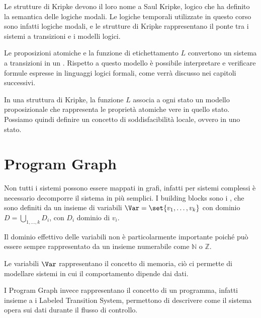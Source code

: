 Le strutture di Kripke devono il loro nome a Saul Kripke, logico che ha definito la semantica delle logiche modali. Le logiche temporali utilizzate in questo corso sono infatti logiche modali, e le strutture di Kripke rappresentano il ponte tra i sistemi a transizioni e i modelli logici.

Le proposizioni atomiche e la funzione di etichettamento \(L\) convertono un sistema a transizioni in un . Rispetto a questo modello è possibile interpretare e verificare formule espresse in linguaggi logici formali, come verrà discusso nei capitoli successivi.

In una struttura di Kripke, la funzione \(L\) associa a ogni stato un modello proposizionale che rappresenta le proprietà atomiche vere in quello stato.
Possiamo quindi definire un concetto di soddisfacibilità locale, ovvero in uno stato.


\section{Program Graph}
Non tutti i sistemi possono essere mappati in grafi, infatti per sistemi complessi è necessario decomporre il sistema in  più semplici.
I building blocks  sono i , che sono definiti da un insieme di variabili \(\Var = \set{v_1,\ldots,v_k}\) con dominio \(D = \bigcup_{1,\ldots,k} D_i\), con \(D_i\) dominio di \(v_i\).

\begin{note}{}
  Il dominio effettivo delle variabili non è particolarmente importante poiché può essere sempre rappresentato da un insieme numerabile come \(\mathbb{N}\) o \(\mathbb{Z}\).
\end{note}

Le variabili \(\Var\) rappresentano il concetto di memoria, ciò ci permette di modellare sistemi in cui il comportamento dipende dai dati.

I Program Graph invece rappresentano il concetto di un programma, infatti insieme a
i Labeled Transition System, permettono di descrivere come il sistema opera sui dati
durante il flusso di controllo.

